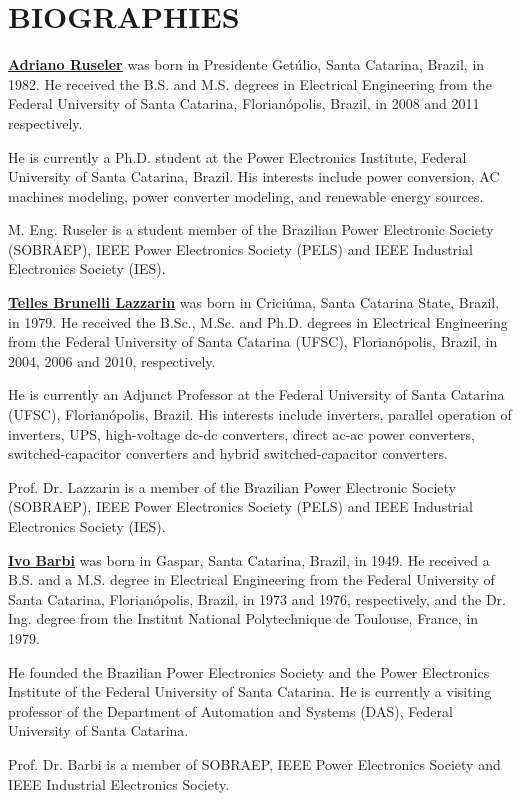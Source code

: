 
\section*{BIOGRAPHIES}

\textbf{\underline{Adriano Ruseler}}
was born in Presidente Getúlio, Santa Catarina, Brazil, in 1982. He received the B.S. and M.S. degrees in Electrical Engineering from 
the Federal University of Santa Catarina, Florianópolis, Brazil,  in 2008 and 2011 respectively.

He is currently a Ph.D. student at the Power Electronics Institute, Federal University of Santa Catarina, Brazil. His interests include power conversion, AC machines modeling, power converter modeling, and renewable energy sources.

M. Eng. Ruseler is a student member of the Brazilian Power Electronic Society (SOBRAEP), IEEE Power Electronics Society (PELS) and IEEE Industrial Electronics Society (IES). 

\vspace{12pt}

\textbf{\underline{Telles Brunelli Lazzarin}}
was born in Criciúma, Santa Catarina State, Brazil, in 1979. He received the B.Sc., M.Sc. and Ph.D. degrees in Electrical Engineering from the Federal University of Santa Catarina (UFSC), Florian\'opolis, Brazil, in 2004, 2006 and 2010, respectively.

He is currently an Adjunct Professor at the Federal University of Santa Catarina (UFSC), Florianópolis, Brazil.  His interests include inverters, parallel operation of inverters, UPS, high-voltage dc-dc converters, direct ac-ac power converters, switched-capacitor converters and hybrid switched-capacitor converters.

Prof. Dr. Lazzarin is a member of the Brazilian Power Electronic Society (SOBRAEP), IEEE Power Electronics Society (PELS) and IEEE Industrial
Electronics Society (IES). 

\vspace{12pt}

\textbf{\underline{Ivo Barbi}} was born in Gaspar, Santa Catarina, Brazil, in 1949. He received a B.S. and a M.S. degree in Electrical Engineering from the Federal University of Santa Catarina, Florianópolis, Brazil, in 1973 and 1976, respectively, and the Dr. Ing. degree from the Institut National Polytechnique de Toulouse, France, in 1979.

He founded the Brazilian Power Electronics Society and the Power Electronics Institute of the Federal University of Santa Catarina.
He is currently a visiting professor of the Department of Automation and Systems (DAS), Federal University of Santa Catarina.

Prof. Dr. Barbi is a member of SOBRAEP, IEEE Power Electronics Society and IEEE Industrial Electronics Society.





